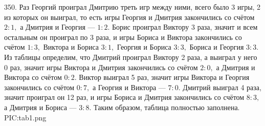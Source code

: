 350. Раз Георгий проиграл Дмитрию треть игр между ними, всего было 3 игры, 2 из которых он выиграл, то есть игры Георгия и Дмитрия закончились со счётом $2:1,$ а Дмитрия и Георгия --- $1:2.$ Борис проиграл Виктору 3 раза, значит и всем остальным он проиграл по 3 раза, и игры Бориса и Виктора закончились со счётом $1:3,$ Виктора и Бориса $3:1,$ Георгия и Бориса $3:3,$ Бориса и Георгия $3:3.$ Из таблицы определим, что Дмитрий проиграл Виктору 2 раза, а выиграл у него 0 раз, значит игры Виктора и Дмитрия закончились со счётом $2:0,$ а Дмитрия и Виктора со счётом $0:2.$ Виктор выиграл 5 раз, значит игры Виктора и Георгия закончились со счётом $0:7,$ а Георгия и Виктора --- $7:0.$ Дмитрий выиграл 4 раза, значит проиграл он 12 раз, и игры Бориса и Дмитрия закончились со счётом $8:3,$ а Дмитрия и Бориса --- $3:8.$ Таким образом, таблица полностью заполнена.\\
{{PIC:tab1.png}}\\
